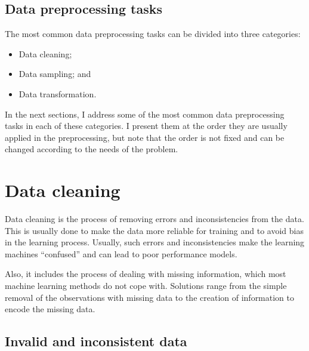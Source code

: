 \subsection{Data preprocessing tasks}

The most common data preprocessing tasks can be divided into three categories:
\begin{itemize}
  \itemsep0em
  \item Data cleaning;
  \item Data sampling; and
  \item Data transformation. %
\end{itemize}

In the next sections, I address some of the most common data preprocessing tasks
in each of these categories.  I present them at the order they are usually applied in the
preprocessing, but note that the order is not fixed and can be changed according to the
needs of the problem.

\section{Data cleaning}

Data cleaning is the process of removing errors and inconsistencies from the data.  This is
usually done to make the data more reliable for training and to avoid bias in the learning
process.  Usually, such errors and inconsistencies make the learning machines ``confused''
and can lead to poor performance models.

Also, it includes the process of dealing with missing information, which most machine
learning methods do not cope with.  Solutions range from the simple removal of the
observations with missing data to the creation of information to encode the missing data.

\subsection{Invalid and inconsistent data}


